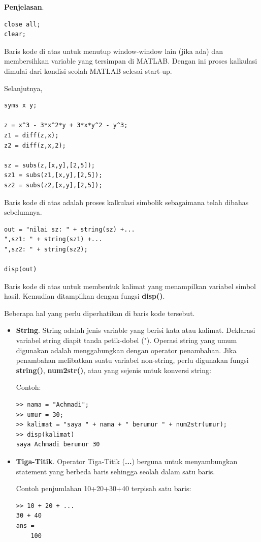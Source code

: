 \documentclass[12pt]{book}
\begin{document}
	\textbf{Penjelasan}.
	\begin{verbatim}
close all;
clear;
	\end{verbatim}
	
	Baris kode di atas untuk menutup window-window lain (jika ada) dan membersihkan variable yang tersimpan di MATLAB.
	Dengan ini proses kalkulasi dimulai dari kondisi seolah MATLAB selesai start-up.	
	
	\newpage
	Selanjutnya,
	\begin{verbatim}
syms x y;

z = x^3 - 3*x^2*y + 3*x*y^2 - y^3;
z1 = diff(z,x);
z2 = diff(z,x,2);

sz = subs(z,[x,y],[2,5]);
sz1 = subs(z1,[x,y],[2,5]);
sz2 = subs(z2,[x,y],[2,5]);
	\end{verbatim}

	Baris kode di atas adalah proses kalkulasi simbolik sebagaimana telah dibahas sebelumnya.
	
	\begin{verbatim}
out = "nilai sz: " + string(sz) +...
",sz1: " + string(sz1) +...
",sz2: " + string(sz2);

disp(out)
	\end{verbatim}

	Baris kode di atas untuk membentuk kalimat yang menampilkan variabel simbol hasil.
	Kemudian ditampilkan dengan fungsi \textbf{disp()}.
	
	Beberapa hal yang perlu diperhatikan di baris kode tersebut.
	\begin{itemize}
		\item \textbf{String}. String adalah jenis variable yang berisi kata atau kalimat.
		Deklarasi variabel string diapit tanda petik-dobel (").
		Operasi string yang umum digunakan adalah menggabungkan dengan operator penambahan.
		Jika penambahan melibatkan suatu variabel non-string, perlu digunakan fungsi \textbf{string()}, \textbf{num2str()},
		atau yang sejenis untuk konversi string:
		
		Contoh: 
		\begin{verbatim}
>> nama = "Achmadi";
>> umur = 30;
>> kalimat = "saya " + nama + " berumur " + num2str(umur);
>> disp(kalimat)
saya Achmadi berumur 30
		\end{verbatim}
	
		\item \textbf{Tiga-Titik}. Operator Tiga-Titik (\textbf{...}) berguna untuk menyambungkan statement yang berbeda baris
		sehingga seolah dalam satu baris.
		
		Contoh penjumlahan 10+20+30+40 terpisah satu baris:
		\begin{verbatim}
>> 10 + 20 + ...
30 + 40
ans =
    100
    	\end{verbatim}
	\end{itemize}
	
\end{document}

